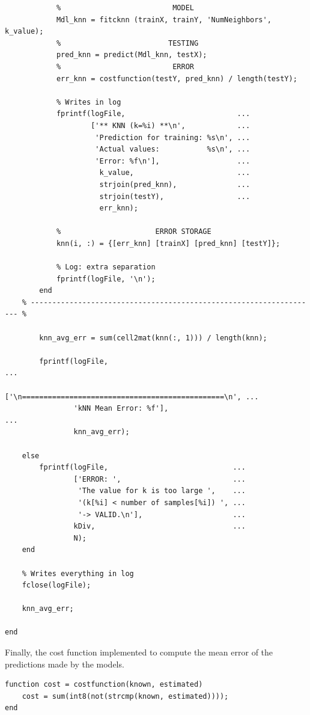 \documentclass[11pt]{article}
\begin{document}
\begin{verbatim}
            %                          MODEL
            Mdl_knn = fitcknn (trainX, trainY, 'NumNeighbors', k_value);
            %                         TESTING
            pred_knn = predict(Mdl_knn, testX);
            %                          ERROR
            err_knn = costfunction(testY, pred_knn) / length(testY);

            % Writes in log
            fprintf(logFile,                          ...
                    ['** KNN (k=%i) **\n',            ...
                     'Prediction for training: %s\n', ...
                     'Actual values:           %s\n', ...
                     'Error: %f\n'],                  ...
                      k_value,                        ...
                      strjoin(pred_knn),              ...
                      strjoin(testY),                 ...
                      err_knn);

            %                      ERROR STORAGE
            knn(i, :) = {[err_knn] [trainX] [pred_knn] [testY]};

            % Log: extra separation
            fprintf(logFile, '\n');
        end
    % ------------------------------------------------------------------- %

        knn_avg_err = sum(cell2mat(knn(:, 1))) / length(knn);

        fprintf(logFile,                                                ...
                ['\n===============================================\n', ...
                'kNN Mean Error: %f'],                                  ...
                knn_avg_err);

    else
        fprintf(logFile,                             ...
                ['ERROR: ',                          ...
                 'The value for k is too large ',    ...
                 '(k[%i] < number of samples[%i]) ', ...
                 '-> VALID.\n'],                     ...
                kDiv,                                ...
                N);
    end

    % Writes everything in log
    fclose(logFile);
    
    knn_avg_err;

end
\end{verbatim}

Finally, the cost function implemented to compute the mean error of the
predictions made by the models.

\begin{verbatim}
function cost = costfunction(known, estimated)
    cost = sum(int8(not(strcmp(known, estimated))));
end
\end{verbatim}
\end{document}
